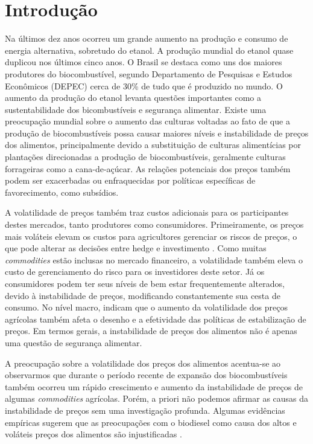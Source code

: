 	\section{Introdução}


Na últimos dez anos ocorreu um grande aumento na produção e consumo de energia alternativa, sobretudo do etanol. A produção mundial do etanol quase duplicou nos últimos cinco anos. O Brasil se destaca como uns dos maiores produtores do  biocombustível, segundo Departamento de Pesquisas e Estudos Econômicos (DEPEC) cerca de 30\%  de tudo que é produzido no mundo. O aumento da produção do etanol levanta questões importantes como a sustentabilidade dos bicombustíveis e  segurança alimentar. Existe uma preocupação mundial sobre o aumento das culturas voltadas ao fato de que a produção de biocombustíveis possa causar  maiores níveis e  instabilidade de preços dos alimentos, principalmente devido a substituição de culturas alimentícias por  plantações direcionadas a produção de biocombustíveis, geralmente culturas forrageiras como a cana-de-açúcar.   As relações potenciais dos preços também podem ser exacerbadas ou enfraquecidas por políticas específicas de favorecimento, como subsídios.

A volatilidade de preços também traz custos adicionais para os participantes destes  mercados, tanto produtores como consumidores. Primeiramente, os preços mais  voláteis  elevam os custos para agricultores gerenciar os riscos de preços, o que pode alterar as decisões entre hedge e investimento \cite{wu_volatility_2011, gardebroek_energy_2013}. Como muitas \emph{commodities} estão inclusas no mercado financeiro, a volatilidade  também eleva o custo de gerenciamento do risco para os investidores deste setor.  Já os consumidores podem ter seus níveis de bem estar frequentemente alterados, devido à instabilidade de preços, modificando constantemente sua cesta de consumo. No nível macro,  indicam que o aumento da volatilidade dos preços agrícolas também afeta o desenho e a efetividade das políticas de estabilização de preços. Em termos gerais, a instabilidade de preços dos alimentos não é apenas uma questão de segurança alimentar. 

 A preocupação sobre a volatilidade dos preços dos alimentos acentua-se ao observarmos que durante o período recente de  expansão dos biocombustíveis também ocorreu um rápido crescimento e aumento da instabilidade de preços  de algumas \emph{commodities} agrícolas. Porém, a priori não podemos afirmar as causas da instabilidade de preços sem uma investigação profunda. Algumas evidências empíricas sugerem que as preocupações com o biodiesel como causa dos altos e voláteis  preços dos alimentos são injustificadas  \cite{lopez_cabrera_volatility_2016} .
 
